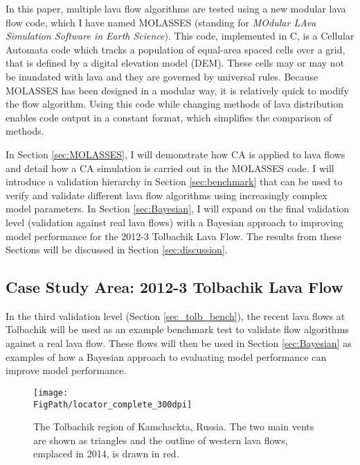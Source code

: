 	In this paper, multiple lava flow algorithms are tested using a new modular lava flow code, which I have named MOLASSES (standing for \textit{MOdular LAva Simulation Software in Earth Science}). This code, implemented in C, is a Cellular Automata code which tracks a population of equal-area spaced cells over a grid, that is defined by a digital elevation model (DEM). These cells may or may not be inundated with lava and they are governed by universal rules. Because MOLASSES has been designed in a modular way, it is relatively quick to modify the flow algorithm. Using this code while changing methods of lava distribution enables code output in a constant format, which simplifies the comparison of methods.
	
	In Section \ref{sec:MOLASSES}, I will demonstrate how CA is applied to lava flows and detail how a CA simulation is carried out in the MOLASSES code. I will introduce a validation hierarchy in Section \ref{sec:benchmark} that can be used to verify and validate different lava flow algorithms using increasingly complex model parameters. In Section \ref{sec:Bayesian}, I will expand on the final validation level (validation against real lava flows) with a Bayesian approach to improving model performance for the 2012-3 Tolbachik Lava Flow. The results from these Sections will be discussed in Section \ref{sec:discussion}.
	
	\subsection{Case Study Area: 2012-3 Tolbachik Lava Flow}\label{sec_tolb_back}
	In the third validation level (Section \ref{sec_tolb_bench}), the recent lava flows at Tolbachik will be used as an example benchmark test to validate flow algorithms against a real lava flow. These flows will then be used in Section \ref{sec:Bayesian} as examples of how a Bayesian approach to evaluating model performance can improve model performance. 
	
\begin{figure}[!h]
	\centering
	\texttt{[image: \\FigPath/locator\_complete\_300dpi]}
	\caption[The Tolbachik region of Kamchackta, Russia]{The Tolbachik region of Kamchackta, Russia. The two main vents are shown as triangles and the outline of western lava flows, emplaced in 2014, is drawn in red.}
	\label{fig_locator}
\end{figure}
	
